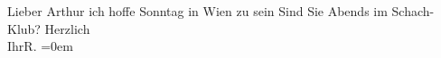 \begin{ledgroupsized}[t]{13cm}
           \pstart{}Lieber Arthur\pend\pstart
           ich hoffe Sonntag in Wien zu sein\pend
           \pstart
           Sind Sie Abends im Schach-Klub?\pend
           \pstart
           Herzlich{\\[\baselineskip]}Ihr\spacefill\mbox{R.}\pend
           \leftskip=0em{}\endnumbering{}\end{ledgroupsized}  \newcommand{\dateiname}{L01019}\newcommand{\titel}{Richard Beer-Hofmann an Arthur Schnitzler, 7. 3. 1900}\newcommand{\editorInnen}{Martin Anton Müller und Gerd-Hermann Susen}
      